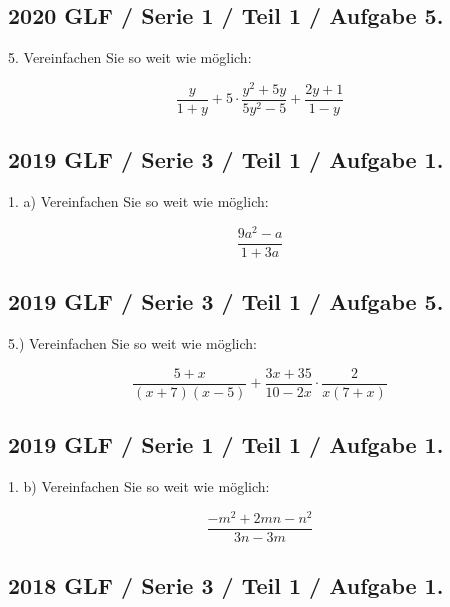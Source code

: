 {

\subsection*{2020 GLF / Serie 1 / Teil 1 / Aufgabe 5.}

5. Vereinfachen Sie so weit wie möglich:

$$\frac{y}{1+y} + 5\cdot{} \frac{y^2+5y}{5y^2-5} + \frac{2y+1}{1-y}$$


\subsection*{2019 GLF / Serie 3 / Teil 1 / Aufgabe 1.}

1. a) Vereinfachen Sie so weit wie möglich:

$$\frac{9a^2-a}{1+3a}$$


\subsection*{2019 GLF / Serie 3 / Teil 1 / Aufgabe 5.}

5.) Vereinfachen Sie so weit wie möglich:

$$\frac{5+x}{(x+7)(x-5)} + \frac{3x+35}{10-2x} \cdot{} \frac2{x(7+x)}$$


\subsection*{2019 GLF / Serie 1 / Teil 1 / Aufgabe 1.}

1. b) Vereinfachen Sie so weit wie möglich:

$$\frac{-m^2+2mn-n^2}{3n-3m}$$



\subsection*{2018 GLF / Serie 3 / Teil 1 / Aufgabe 1.}

}
